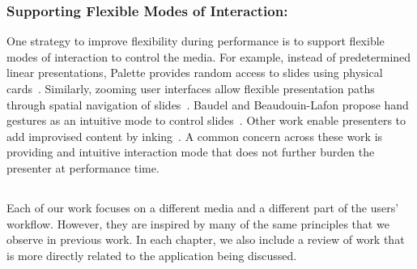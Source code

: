 \subsubsection*{Supporting Flexible Modes of Interaction:} One strategy to improve flexibility during performance is to support flexible modes of interaction to control the media. For example, instead of predetermined linear presentations, Palette provides random access to slides using physical cards~\cite{nelson1999palette}. Similarly, zooming user interfaces allow flexible presentation paths through spatial navigation of slides~\cite{lichtschlag2009fly,good2002zoomable}. Baudel and Beaudouin-Lafon propose hand gestures as an intuitive mode to control slides~\cite{baudel1993charade}. Other work enable presenters to add improvised content by inking~\cite{anderson2007classroom,golub2004handwritten}. A common concern across these work is providing and intuitive interaction mode that does not further burden the presenter at performance time.\\ 

\subsection*{}
Each of our work focuses on a different media and a different part of the users' workflow. However, they are inspired by many of the same principles that we observe in previous work. In each chapter, we also include a review of work that is more directly related to the application being discussed. 
 

